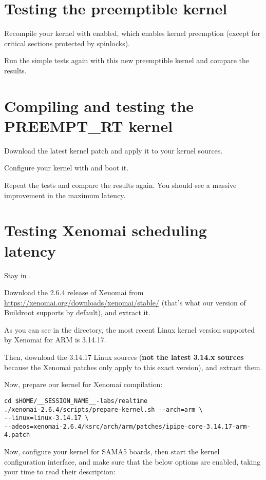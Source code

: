 \section{Testing the preemptible kernel}

Recompile your kernel with  enabled, which
enables kernel preemption (except for critical sections protected by
spinlocks).

Run the simple tests again with this new preemptible kernel and compare
the results.

\section{Compiling and testing the PREEMPT\_RT kernel}

Download the latest  kernel patch and apply it to
your kernel sources.

Configure your kernel with  and boot it.

Repeat the tests and compare the results again. You should see a massive
improvement in the maximum latency.

\section{Testing Xenomai scheduling latency}

Stay in .

Download the 2.6.4 release of Xenomai from
\url{https://xenomai.org/downloads/xenomai/stable/}
(that's what our version of
Buildroot supports by default), and extract it.

As you can see in the  directory,
the most recent Linux kernel version supported by Xenomai for ARM is
3.14.17.

Then, download the 3.14.17 Linux sources ({\bf not the latest 3.14.x
sources} because the Xenomai patches only apply to this exact version),
and extract them.
 
Now, prepare our kernel for Xenomai compilation:
\begin{verbatim}
cd $HOME/__SESSION_NAME__-labs/realtime
./xenomai-2.6.4/scripts/prepare-kernel.sh --arch=arm \
--linux=linux-3.14.17 \
--adeos=xenomai-2.6.4/ksrc/arch/arm/patches/ipipe-core-3.14.17-arm-4.patch
\end{verbatim}

Now, configure your kernel for SAMA5 boards, then start the kernel
configuration interface, and make sure that the below options are
enabled, taking your time to read their description:

